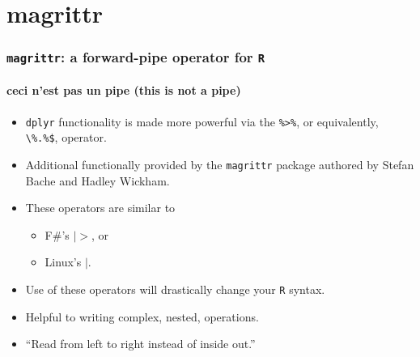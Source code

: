 \documentclass{beamer}\usepackage[]{graphicx}\usepackage[]{color}
\begin{document}
\section{magrittr}%
\begin{frame}[fragile]
  \frametitle{{\tt magrittr}: a forward-pipe operator for {\tt R}}
  \framesubtitle{ceci n'est pas un pipe (this is not a pipe)}

  \begin{itemize}
    \item {\tt dplyr} functionality is made more powerful via the \verb|%>%|,
      or equivalently, \verb|\%.%$|, operator.

    \item Additional functionally provided by the {\tt magrittr} package
      authored by Stefan Bache and Hadley Wickham.

    \item These operators are similar to 
      \begin{itemize} 
        \item F\#'s $|>$, or
        \item Linux's $|$.
      \end{itemize}

    \item Use of these operators will drastically change your {\tt R} syntax.

    \item Helpful to writing complex, nested, operations.
    \item``Read from left to right instead of inside out.''

  \end{itemize}
\end{frame} 
\end{document}
